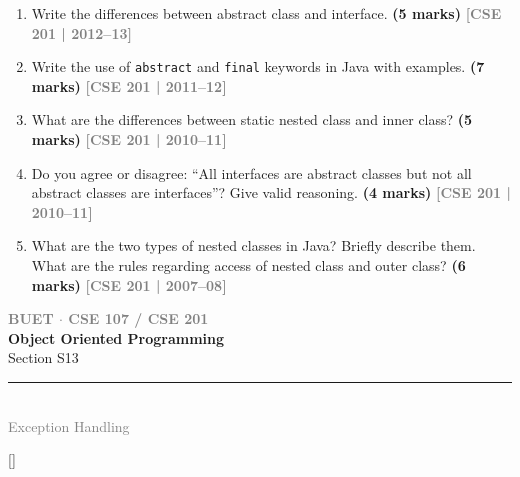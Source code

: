 \documentclass[12pt,a3paper]{article}
\newcommand{\yr}[1]{\hfill\textcolor{gray}{\small\textbf{[#1]}}}
\newcommand{\mk}[1]{\textcolor{orange!70!black}{\small\textbf{(#1 marks)}}}
\newcommand{\secdivider}[4]{%
  \newpage\thispagestyle{empty}%
  \vspace*{\fill}%
  \begin{tcolorbox}[enhanced,colback=#4!7,colframe=#3,boxrule=1.5pt,arc=8pt,
    left=20pt,right=20pt,top=22pt,bottom=22pt,
    shadow={3pt}{-3pt}{0pt}{black!15}]
    \centering
    {\large\textcolor{gray}{\textbf{BUET $\cdot$ CSE 107 / CSE 201}}}\\[8pt]
    {\fontsize{26}{32}\selectfont\bfseries\textcolor{#3}{Object Oriented Programming}}\\[6pt]
    {\fontsize{15}{19}\selectfont\textcolor{dgray}{#1}}\\[12pt]
    \textcolor{#3!60}{\rule{0.5\textwidth}{0.5pt}}\\[6pt]
    {\small\textcolor{gray}{#2}}
  \end{tcolorbox}%
  \vspace*{\fill}\newpage%
}
\begin{document}
\begin{enumerate}



\item Write the differences between abstract class and interface. \mk{5}
\yr{CSE 201 | 2012--13}




\item Write the use of \texttt{abstract} and \texttt{final} keywords in Java with examples. \mk{7}
\yr{CSE 201 | 2011--12}




\item What are the differences between static nested class and inner class? \mk{5}
\yr{CSE 201 | 2010--11}




\item Do you agree or disagree: ``All interfaces are abstract classes but not all abstract classes are interfaces''? Give valid reasoning. \mk{4}
\yr{CSE 201 | 2010--11}




\item What are the two types of nested classes in Java? Briefly describe them. What are the rules regarding access of nested class and outer class? \mk{6}
\yr{CSE 201 | 2007--08}





\end{enumerate}
\newpage

\secdivider{Section S13}{Exception Handling}{cE}{cE}
\titleformat{\section}{\large\bfseries\color{cE}}{}{0em}{}[\titlerule]
\end{document}
